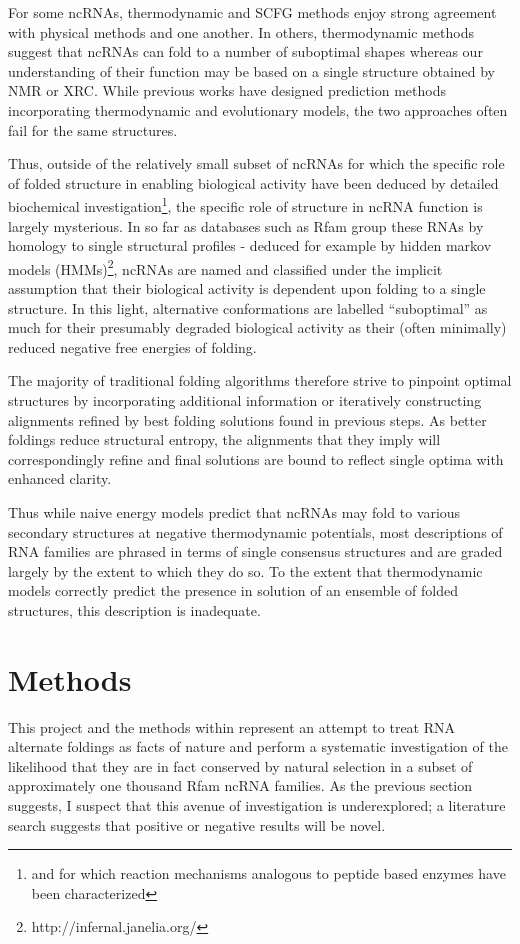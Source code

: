 \documentclass[12pt,a4paper]{article}
\begin{document}
For some ncRNAs, thermodynamic and SCFG methods enjoy strong agreement with physical methods and one another. In others, thermodynamic methods suggest that ncRNAs can fold to a number of suboptimal shapes whereas our understanding of their function may be based on a single structure obtained by NMR or XRC. While previous works \cite{RefWorks:22} have designed prediction methods incorporating thermodynamic and evolutionary models, the two approaches often fail for the same structures. 

Thus, outside of the relatively small subset of ncRNAs for which the specific role of folded structure in enabling biological activity have been deduced by detailed biochemical investigation\footnote{and for which reaction mechanisms analogous to peptide based enzymes have been characterized}, the specific role of structure in ncRNA function is largely mysterious. In so far as databases such as Rfam group these RNAs by homology to single structural profiles - deduced for example by hidden markov models (HMMs)\footnote{http://infernal.janelia.org/}, ncRNAs are named and classified under the implicit assumption that their biological activity is dependent upon folding to a single structure. In this light, alternative conformations are labelled ``suboptimal'' as much for their presumably degraded biological activity as their (often minimally) reduced negative free energies of folding.

The majority of traditional folding algorithms therefore strive to pinpoint optimal structures by incorporating additional information or iteratively constructing alignments refined by best folding solutions found in previous steps. As better foldings reduce structural entropy, the alignments that they imply will correspondingly refine and final solutions are bound to reflect single optima with enhanced clarity. 

Thus while naive energy models predict that ncRNAs may fold to various secondary structures at negative thermodynamic potentials, most descriptions of RNA families are phrased in terms of single consensus structures and are graded largely by the extent to which they do so. To the extent that thermodynamic models correctly predict the presence in solution of an ensemble of folded structures, this description is inadequate.

\section{Methods}
This project and the methods within represent an attempt to treat RNA alternate foldings as facts of nature and perform a systematic investigation of the likelihood that they are in fact conserved by natural selection in a subset of approximately one thousand Rfam ncRNA families. As the previous section suggests, I suspect that this avenue of investigation is underexplored; a literature search suggests that positive or negative results will be novel.
\end{document}
